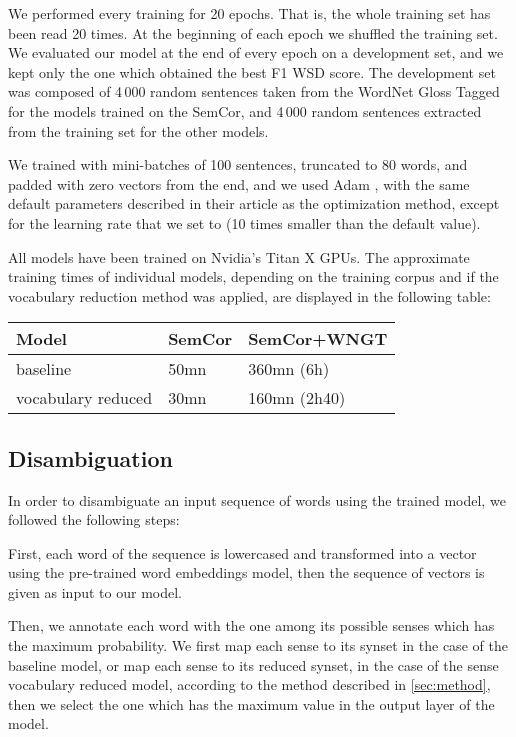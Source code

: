 \documentclass[11pt,a4paper]{article}
\begin{document}
We performed every training for 20 epochs. That is, the whole training set has been read 20 times. At the beginning of each epoch we shuffled the training set. We evaluated our model at the end of every epoch on a development set, and we kept only the one which obtained the best F1 WSD score. The development set was composed of 4\,000 random sentences taken from the WordNet Gloss Tagged for the models trained on the SemCor, and 4\,000 random sentences extracted from the training set for the other models.



We trained with mini-batches of 100 sentences, truncated to 80 words, and padded with zero vectors from the end, and we used Adam \cite{KingmaB14}, with the same default parameters described in their article as the optimization method, except for the learning rate that we set to  (10 times smaller than the default value).

All models have been trained on Nvidia's Titan X GPUs. The approximate training times of individual models, depending on the training corpus and if the vocabulary reduction method was applied, are displayed in the following table: 


\begin{table}[h]
\small
\centering
\tabulinesep=2pt
\begin{tabu} to \linewidth {X[1lm]|X[1cm]|X[1.3cm]}
Model & SemCor & SemCor+WNGT \\
\midrule
baseline & 50mn & 360mn (6h) \\
\midrule
vocabulary reduced & 30mn & 160mn (2h40) \\
\end{tabu}
\label{tab:times}
\end{table}







\subsection{Disambiguation}

In order to disambiguate an input sequence of words using the trained model, we followed the following steps: 

First, each word of the sequence is lowercased and transformed into a vector using the pre-trained word embeddings model, then the sequence of vectors is given as input to our model.

Then, we annotate each word with the one among its possible senses which has the maximum probability. We first map each sense to its synset in the case of the baseline model, or map each sense to its reduced synset, in the case of the sense vocabulary reduced model, according to the method described in \autoref{sec:method}, then we select the one which has the maximum value in the output layer of the model.
\end{document}
